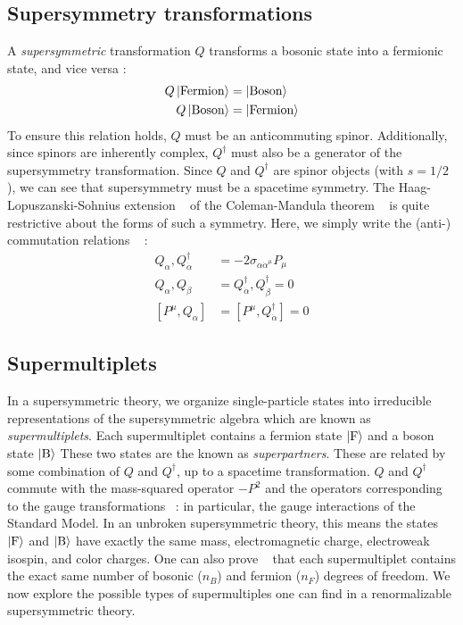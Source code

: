 \subsection{Supersymmetry transformations}

A \textit{supersymmetric} transformation $Q$ transforms a bosonic state into a fermionic state, and vice versa :
\begin{align}
Q \ket{\text{Fermion}} &= \ket{\text{Boson}} \\
Q \ket{\text{Boson}} &= \ket{\text{Fermion}}
\end{align}
To ensure this relation holds, $Q$ must be an anticommuting spinor.
Additionally, since spinors are inherently complex, $Q^\dagger$ must also be a generator of the supersymmetry transformation.
Since $Q$ and $Q^\dagger$ are spinor objects (with $s = 1/2$), we can see that supersymmetry must be a spacetime symmetry.
The Haag-Lopuszanski-Sohnius extension ~\cite{Haag:1974qh} of the Coleman-Mandula theorem ~\cite{Coleman:1967ad} is quite restrictive about the forms of such a symmetry.
Here, we simply write the (anti-) commutation relations ~\cite{susyPrimer} :
\begin{align}
{Q_\alpha, Q_{\dot{\alpha}}^\dagger} &= -2 \sigma_{\alpha \dot{\alpha}^\mu} P_\mu \\
{Q_\alpha,Q_{\dot{\beta}}} &= {Q_{\dot{\alpha}}^\dagger, Q_{\dot{\beta}}^\dagger}  = 0 \\
[P^\mu , Q_{\alpha} ] &= [P^\mu, Q_{\dot{\alpha}}^\dagger] = 0
\end{align}

\subsection{Supermultiplets}\label{subsec:supermultiplets}

In a supersymmetric theory, we organize single-particle states into irreducible representations of the supersymmetric algebra which are known as \textit{supermultiplets}.
Each supermultiplet contains a fermion state $\ket{\text{F}}$ and a boson state $\ket{\text{B}}$
These two states are the known as \textit{superpartners}.
These are related by some combination of $Q$ and $Q^\dagger$, up to a spacetime transformation.
$Q$ and $Q^\dagger$ commute with the mass-squared operator $-P^2$ and the operators corresponding to the gauge transformations ~\cite{susyPrimer}: in particular, the gauge interactions of the Standard Model.
In an unbroken supersymmetric theory, this means the states $\ket{\text{F}}$ and $\ket{\text{B}}$ have exactly the same mass, electromagnetic charge, electroweak isospin, and color charges.
One can also prove ~\cite{susyPrimer} that each supermultiplet contains the exact same number of bosonic ($n_B$) and fermion ($n_F$) degrees of freedom.
We now explore the possible types of supermultiples one can find in a renormalizable supersymmetric theory.

